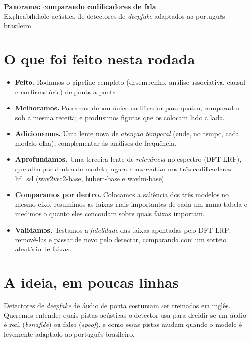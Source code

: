 \documentclass[11pt,a4paper]{article}
\begin{document}
\begin{center}
  {\large\textbf{Panorama: comparando codificadores de fala}}\\[0.2em]
  {\small Explicabilidade acústica de detectores de \emph{deepfake} adaptados ao
  português brasileiro}
\end{center}

\section{O que foi feito nesta rodada}

\begin{itemize}[nosep]
  \item \textbf{Feito.} Rodamos o pipeline completo (desempenho, análise
        associativa, causal e confirmatória) de ponta a ponta.
  \item \textbf{Melhoramos.} Passamos de um único codificador para quatro,
        comparados sob a mesma receita; e produzimos figuras que os colocam lado a
        lado.
  \item \textbf{Adicionamos.} Uma lente nova de \emph{atenção temporal} (onde, no
        tempo, cada modelo olha), complementar às análises de frequência.
  \item \textbf{Aprofundamos.} Uma terceira lente de \emph{relevância} no espectro
        (DFT-LRP), que olha por dentro do modelo, agora conservativa nos três
        codificadores hf\_ssl (wav2vec2-base, hubert-base e wavlm-base).
  \item \textbf{Comparamos por dentro.} Colocamos a saliência dos três modelos no
        mesmo eixo, resumimos as faixas mais importantes de cada um numa tabela e
        medimos o quanto eles concordam sobre quais faixas importam.
  \item \textbf{Validamos.} Testamos a \emph{fidelidade} das faixas apontadas pelo
        DFT-LRP: removê-las e passar de novo pelo detector, comparando com um sorteio
        aleatório de faixas.
\end{itemize}

\section{A ideia, em poucas linhas}

Detectores de \emph{deepfake} de áudio de ponta costumam ser treinados em inglês.
Queremos entender quais pistas acústicas o detector usa para decidir se um áudio é
real (\emph{bonafide}) ou falso (\emph{spoof}), e como essas pistas mudam quando o
modelo é levemente adaptado ao português brasileiro.
\end{document}
